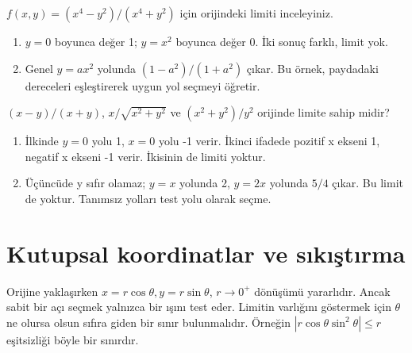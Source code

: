 \begin{tcolorbox}[title={Örnek 4.11 | Parabol yoluyla limitin yokluğu},colframe=accent]\(f(x,y)=(x^4-y^2)/(x^4+y^2)\) için orijindeki limiti inceleyiniz.
\par{}\end{tcolorbox}
\begin{tcolorbox}[title={Adım adım çözüm},colback=green!3!white,colframe=green]\begin{enumerate}
\item \(y=0\) boyunca değer 1; \(y=x^2\) boyunca değer 0. İki sonuç farklı, limit yok.
\item Genel \(y=ax^2\) yolunda \((1-a^2)/(1+a^2)\) çıkar. Bu örnek, paydadaki dereceleri eşleştirerek uygun yol seçmeyi öğretir.
\end{enumerate}\end{tcolorbox}
\begin{tcolorbox}[title={Örnek 4.12 | İki başka karşı örnek},colframe=accent]\((x-y)/(x+y)\), \(x/\sqrt{x^2+y^2}\) ve \((x^2+y^2)/y^2\) orijinde limite sahip midir?
\par{}\end{tcolorbox}
\begin{tcolorbox}[title={Adım adım çözüm},colback=green!3!white,colframe=green]\begin{enumerate}
\item İlkinde \(y=0\) yolu 1, \(x=0\) yolu -1 verir. İkinci ifadede pozitif x ekseni 1, negatif x ekseni -1 verir. İkisinin de limiti yoktur.
\item Üçüncüde y sıfır olamaz; \(y=x\) yolunda 2, \(y=2x\) yolunda \(5/4\) çıkar. Bu limit de yoktur. Tanımsız yolları test yolu olarak seçme.
\end{enumerate}\end{tcolorbox}
\section{Kutupsal koordinatlar ve sıkıştırma}
Orijine yaklaşırken \(x=r\cos\theta,y=r\sin\theta\), \(r\to0^+\) dönüşümü yararlıdır. Ancak sabit bir açı seçmek yalnızca bir ışını test eder. Limitin varlığını göstermek için \(\theta\) ne olursa olsun sıfıra giden bir sınır bulunmalıdır. Örneğin \(|r\cos\theta\sin^2\theta|\le r\) eşitsizliği böyle bir sınırdır.

